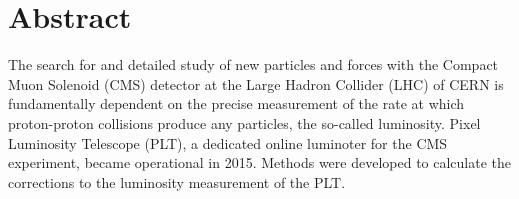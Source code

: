 \chapter*{Abstract}\label{ch:abstract}
The search for and detailed study of new particles and forces with the Compact Muon Solenoid (CMS) detector at the Large Hadron Collider (LHC) of CERN is fundamentally dependent on the precise measurement of the rate at which proton-proton collisions produce any particles, the so-called luminosity. Pixel Luminosity Telescope (PLT), a dedicated online luminoter for the CMS experiment, became operational in 2015. Methods were developed to calculate the corrections to the luminosity measurement of the PLT.
